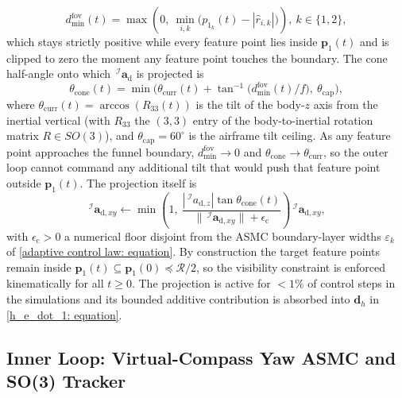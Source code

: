 \begin{equation} \label{d min fov: equation}
    d_\text{min}^\text{fov}(t) = \max\!\left(0,\ \min_{i,k}\!\big(p_{1_k}(t)-|\hat{r}_{i,k}|\big)\right),\ k\in\{1,2\},
\end{equation}
which stays strictly positive while every feature point lies inside $\boldsymbol{p}_1(t)$ and is clipped to zero the moment any feature point touches the boundary. The cone half-angle onto which $\,^\mathcal{I}\boldsymbol{a}_\text{d}$ is projected is
\begin{equation} \label{cone angle: equation}
    \theta_\text{cone}(t) = \min\!\Big(\theta_\text{curr}(t) + \tan^{-1}\!\big(d_\text{min}^\text{fov}(t)/f\big),\ \theta_\text{cap}\Big),
\end{equation}
where $\theta_\text{curr}(t)=\arccos(R_{33}(t))$ is the tilt of the body-$z$ axis from the inertial vertical (with $R_{33}$ the $(3,3)$ entry of the body-to-inertial rotation matrix $R\in SO(3)$), and $\theta_\text{cap}=60^\circ$ is the airframe tilt ceiling. As any feature point approaches the funnel boundary, $d_\text{min}^\text{fov}\to 0$ and $\theta_\text{cone}\to\theta_\text{curr}$, so the outer loop cannot command any additional tilt that would push that feature point outside $\boldsymbol{p}_1(t)$. The projection itself is
\begin{equation} \label{cone clamp: equation}
    \,^\mathcal{I}\boldsymbol{a}_{\text{d},xy}\leftarrow \min\!\left(1,\ \frac{|\,^\mathcal{I}a_{\text{d},z}|\tan\theta_\text{cone}(t)}{\|\,^\mathcal{I}\boldsymbol{a}_{\text{d},xy}\|+\epsilon_\text{c}}\right)\!\,^\mathcal{I}\boldsymbol{a}_{\text{d},xy},
\end{equation}
with $\epsilon_\text{c}>0$ a numerical floor disjoint from the ASMC boundary-layer widths $\varepsilon_k$ of \eqref{adaptive control law: equation}. By construction the target feature points remain inside $\boldsymbol{p}_1(t)\subseteq\boldsymbol{p}_1(0)\preceq\mathcal{R}/2$, so the visibility constraint is enforced kinematically for all $t\ge 0$. The projection is active for $<1\%$ of control steps in the simulations and its bounded additive contribution is absorbed into $\boldsymbol{d}_h$ in \eqref{h_e_dot_1: equation}.

\subsection{Inner Loop: Virtual-Compass Yaw ASMC and SO(3) Tracker} \label{inner loop: section}

